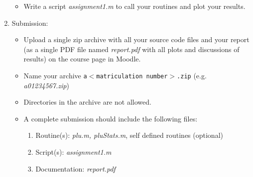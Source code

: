 \documentclass{scrartcl}
\begin{document}
\begin{enumerate}
\begin{itemize}
		\item Write a script \textit{assignment1.m} to call your routines and plot your results.
	\end{itemize}

	\item Submission:
	\begin{itemize}		
		\item  Upload a single zip archive with all your source code files and your report (as a single
			PDF file named \textit{report.pdf} with all plots and discussions of results) on the course page in Moodle.
		\item Name your archive \texttt{a$<$matriculation number$>$.zip} (e.g. \textit{a01234567.zip})
		\item Directories in the archive are not allowed.
		\item A complete submission should include the following files:
		\begin{enumerate}
		\item Routine(s): \textit{plu.m, pluStats.m}, self defined routines (optional)
		\item Script(s): \textit{assignment1.m}
		\item Documentation: \textit{report.pdf}
		\end{enumerate}
		
		\end{itemize}
	\end{enumerate}
\end{document}
